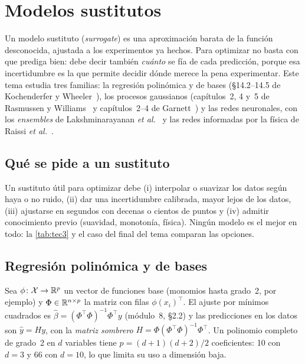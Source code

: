 \chapter{Modelos sustitutos}
\label{tema:3}

Un modelo sustituto (\emph{surrogate}) es una aproximación barata de la función desconocida, ajustada a los experimentos ya hechos. Para optimizar no basta con que prediga bien: debe decir también \emph{cuánto} se fía de cada predicción, porque esa incertidumbre es la que permite decidir dónde merece la pena experimentar. Este tema estudia tres familias: la regresión polinómica y de bases (§14.2–14.5 de Kochenderfer y Wheeler~\cite{kw}), los procesos gaussianos (capítulos~2, 4 y~5 de Rasmussen y Williams~\cite{rw} y capítulos~2–4 de Garnett~\cite{garnett}) y las redes neuronales, con los \emph{ensembles} de Lakshminarayanan \emph{et al.}~\cite{lakshmi} y las redes informadas por la física de Raissi \emph{et al.}~\cite{raissi}.

\section{Qué se pide a un sustituto}

Un sustituto útil para optimizar debe (i) interpolar o suavizar los datos según haya o no ruido, (ii) dar una incertidumbre calibrada, mayor lejos de los datos, (iii) ajustarse en segundos con decenas o cientos de puntos y (iv) admitir conocimiento previo (suavidad, monotonía, física). Ningún modelo es el mejor en todo: la \cref{tab:tec3} y el caso del final del tema comparan las opciones.

\section{Regresión polinómica y de bases}

Sea $\phi\colon\mathcal{X}\to\mathbb{R}^{p}$ un vector de funciones base (monomios hasta grado~2, por ejemplo) y $\Phi\in\mathbb{R}^{n\times p}$ la matriz con filas $\phi(x_i)^\top$. El ajuste por mínimos cuadrados es $\hat\beta=(\Phi^\top\Phi)^{-1}\Phi^\top y$ (módulo~8, §2.2) y las predicciones en los datos son $\hat y=Hy$, con la \emph{matriz sombrero} $H=\Phi(\Phi^\top\Phi)^{-1}\Phi^\top$. Un polinomio completo de grado~2 en $d$ variables tiene $p=(d+1)(d+2)/2$ coeficientes: 10 con $d=3$ y 66 con $d=10$, lo que limita su uso a dimensión baja.

